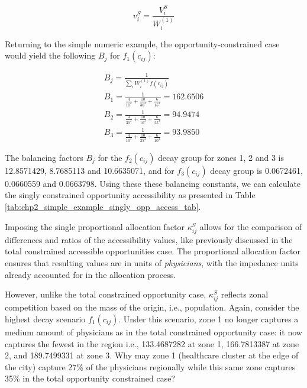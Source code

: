 \documentclass[
11pt, %
oneside, %
english, %
singlespacing, %
]{macthesis} %
\begin{document}
\begin{equation}
\label{eq:opportunity-constrained-accessibility-per-capita}
v^S_{i} = \frac{V^S_{i}}{W^{(1)}_i}
\end{equation} 

Returning to the simple numeric example, the opportunity-constrained case would yield the following \(B_{j}\) for \(f_1(c_{ij})\):

\[
\begin{array}{l}
B_{j} = \frac{1}{\sum_i W_i^{(1)} f(c_{ij})}\\
B_{1} =  \frac{1}{\frac{4}{10^3} + \frac{10}{30^3} + \frac{6}{15^3}} = 162.6506\\ 
B_{2} =  \frac{1}{\frac{4}{30^3} + \frac{10}{10^3} + \frac{6}{25^3}} = 94.9474\\
B_{3} =  \frac{1}{\frac{4}{10^3} + \frac{10}{25^3} + \frac{6}{10^3}} = 93.9850
\end{array}
\]

The balancing factors \(B_j\) for the \(f_2(c_{ij})\) decay group for zones 1, 2 and 3 is 12.8571429, 8.7685113 and 10.6635071, and for \(f_3(c_{ij})\) decay group is 0.0672461, 0.0660559 and 0.0663798. Using these these balancing constants, we can calculate the singly constrained opportunity accessibility as presented in Table \ref{tab:chp2_simple_example_singly_opp_access_tab}.



Imposing the single proportional allocation factor \(\kappa^S_{ij}\) allows for the comparison of differences and ratios of the accessibility values, like previously discussed in the total constrained accessible opportunities case. The proportional allocation factor ensures that resulting values are in units of \emph{physicians}, with the impedance units already accounted for in the allocation process.

However, unlike the total constrained opportunity case, \(\kappa^S_{ij}\) reflects zonal competition based on the mass of the origin, i.e., population. Again, consider the highest decay scenario \(f_1(c_{ij})\). Under this scenario, zone 1 no longer captures a medium amount of physicians as in the total constrained opportunity case: it now captures the fewest in the region i.e., 133.4687282 at zone 1, 166.7813387 at zone 2, and 189.7499331 at zone 3. Why may zone 1 (healthcare cluster at the edge of the city) capture 27\% of the physicians regionally while this same zone captures 35\% in the total opportunity constrained case?
\end{document}
